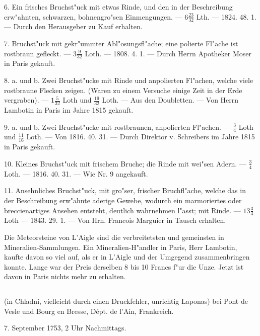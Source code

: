 \documentclass[a4paper, 11pt, oneside, polutonikogreek, german]{article}
\begin{document}
6. Ein frisches Bruchst"uck mit etwas Rinde, und den in der Beschreibung erw"ahnten, schwarzen, bohnengro"sen Einmengungen. --- $6\frac{23}{32}$ Lth. --- 1824. 48. 1. --- Durch den Herausgeber zu Kauf erhalten.

7. Bruchst"uck mit gekr"ummter Abl"osungsfl"ache; eine polierte Fl"ache ist rostbraun gefleckt. --- $3\frac{9}{32}$ Loth. --- 1808. 4. 1. --- Durch Herrn Apotheker Moser in Paris gekauft.

8. a. und b. Zwei Bruchst"ucke mit Rinde und anpolierten Fl"achen, welche viele rostbraune Flecken zeigen. (Waren zu einem Versuche einige Zeit in der Erde vergraben). --- $1\frac{5}{32}$ Loth und $\frac{19}{32}$ Loth. --- Aus den Doubletten. --- Von Herrn Lambotin in Paris im Jahre 1815 gekauft.

9. a. und b. Zwei Bruchst"ucke mit rostbraunen, anpolierten Fl"achen. --- $\frac{3}{4}$ Loth und $\frac{11}{16}$ Loth. --- Von 1816. 40. 31. --- Durch Direktor v. Schreibers im Jahre 1815 in Paris gekauft.

10. Kleines Bruchst"uck mit frischem Bruche; die Rinde mit wei"sen Adern. --- $\frac{3}{4}$ Loth. --- 1816. 40. 31. --- Wie Nr. 9 angekauft.

11. Ansehnliches Bruchst"uck, mit gro"ser, frischer Bruchfl"ache, welche das in der Beschreibung erw"ahnte aderige Gewebe, wodurch ein marmoriertes oder breccienartiges Ansehen entsteht, deutlich wahrnehmen l"asst; mit Rinde. --- $13\frac{3}{4}$ Loth --- 1843. 29. 1. --- Von Hrn. Francois Marguier in Tausch erhalten.

\setlength{\leftskip}{10mm}
\setlength{\parindent}{0pt}

{\footnotesize Die Meteorsteine von L’Aigle sind die verbreitetsten und gemeinsten in Mineralien-Sammlungen. Ein Mineralien-H"andler in Paris, Herr Lambotin, kaufte davon so viel auf, als er in L’Aigle und der Umgegend zusammenbringen konnte. Lange war der Preis derselben 8 bis 10 Francs f"ur die Unze. Jetzt ist davon in Paris nichts mehr zu erhalten.}

\setlength{\leftskip}{0pt}
\setlength{\parindent}{20pt}

\subsection[\frakfamily{Liponas.}]{}
\begin{center}

(in Chladni, vielleicht durch einen Druckfehler, unrichtig Laponas) bei Pont de Vesle und Bourg en Bresse, Dépt. de l'Ain, Frankreich.

7. September 1753, 2 Uhr Nachmittags.
\end{center}
\end{document}
